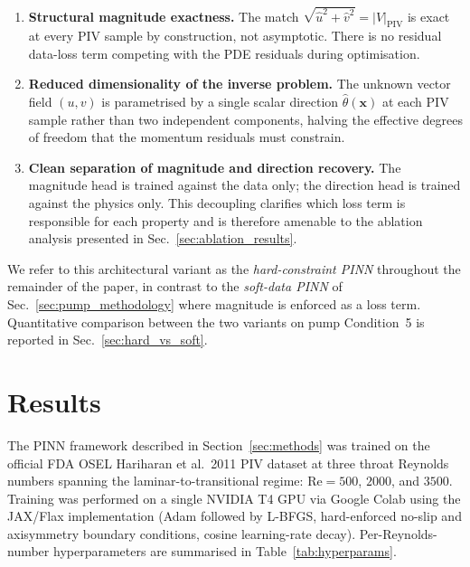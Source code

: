 \documentclass[12pt,a4paper]{article}
\newcommand{\bx}{\bm{x}}          %
\newcommand{\Reyn}{\mathrm{Re}}    %
\begin{document}
\begin{enumerate}[leftmargin=*, itemsep=2pt]
  \item \textbf{Structural magnitude exactness.} The match
    $\sqrt{\hat{u}^2 + \hat{v}^2} = |V|_{\text{PIV}}$ is exact at
    every PIV sample by construction, not asymptotic. There is no
    residual data-loss term competing with the PDE residuals
    during optimisation.
  \item \textbf{Reduced dimensionality of the inverse problem.}
    The unknown vector field $(u, v)$ is parametrised by a single
    scalar direction $\hat{\theta}(\bx)$ at each PIV sample
    rather than two independent components, halving the
    effective degrees of freedom that the momentum residuals must
    constrain.
  \item \textbf{Clean separation of magnitude and direction
    recovery.} The magnitude head is trained against the data
    only; the direction head is trained against the physics only.
    This decoupling clarifies which loss term is responsible for
    each property and is therefore amenable to the ablation
    analysis presented in Sec.~\ref{sec:ablation_results}.
\end{enumerate}

We refer to this architectural variant as the
\emph{hard-constraint PINN} throughout the remainder of the
paper, in contrast to the \emph{soft-data PINN} of
Sec.~\ref{sec:pump_methodology} where magnitude is enforced as a
loss term. Quantitative comparison between the two variants on
pump Condition~5 is reported in Sec.~\ref{sec:hard_vs_soft}.

\section{Results}
\label{sec:results}

The PINN framework described in Section~\ref{sec:methods} was
trained on the official FDA OSEL Hariharan et al.\ 2011 PIV dataset
\cite{Hariharan2011FDA} at three throat Reynolds numbers spanning
the laminar-to-transitional regime: $\Reyn = 500$, $2000$, and
$3500$. Training was performed on a single NVIDIA T4 GPU via Google
Colab using the JAX/Flax implementation (Adam followed by L-BFGS,
hard-enforced no-slip and axisymmetry boundary conditions, cosine
learning-rate decay). Per-Reynolds-number hyperparameters are
summarised in Table~\ref{tab:hyperparams}.
\end{document}
